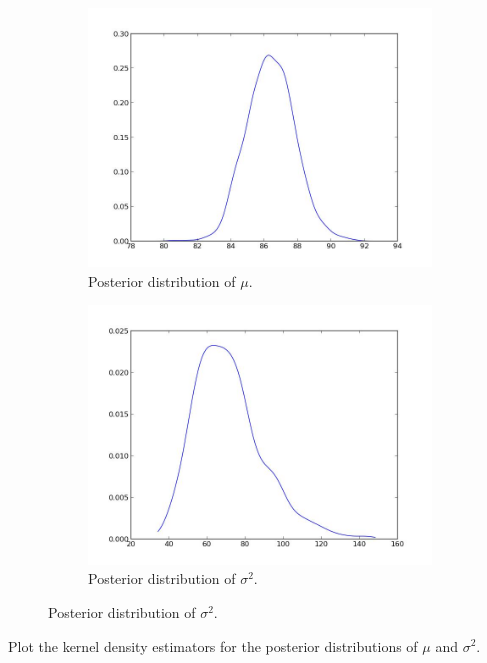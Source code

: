 \begin{figure}
	\centering
	\begin{subfigure}[b]{.49\textwidth}
		\centering
		\includegraphics[width=\textwidth]{mu_posterior.jpeg}
		\caption{Posterior distribution of $\mu$.}
	\end{subfigure}
	\begin{subfigure}[b]{.49\textwidth}
		\centering
		\includegraphics[width=\textwidth]{sigma2_posterior.jpeg}
		\caption{Posterior distribution of $\sigma^2$.}
	\end{subfigure}
\end{figure}

\begin{problem}
Plot the kernel density estimators for the posterior distributions of $\mu$ and $\sigma^{2}$.
\end{problem}

